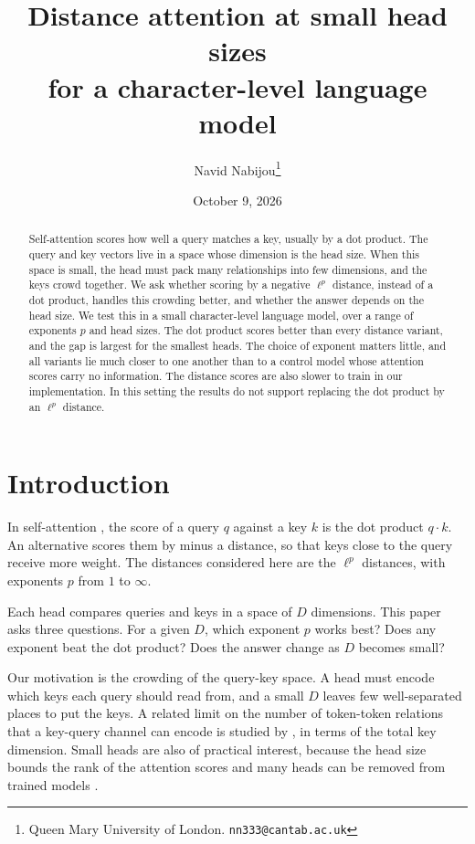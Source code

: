 \documentclass[11pt]{article}
\title{Distance attention at small head sizes\\for a character-level language model}
\author{Navid Nabijou\thanks{Queen Mary University of London. \texttt{nn333@cantab.ac.uk}}}
\date{October 9, 2026}
\begin{document}
\maketitle

\begin{abstract}
Self-attention scores how well a query matches a key, usually by a dot product.
The query and key vectors live in a space whose dimension is the head size.
When this space is small, the head must pack many relationships into few dimensions, and the keys crowd together.
We ask whether scoring by a negative $\ell^p$ distance, instead of a dot product, handles this crowding better, and whether the answer depends on the head size.
We test this in a small character-level language model, over a range of exponents $p$ and head sizes.
The dot product scores better than every distance variant, and the gap is largest for the smallest heads.
The choice of exponent matters little, and all variants lie much closer to one another than to a control model whose attention scores carry no information.
The distance scores are also slower to train in our implementation.
In this setting the results do not support replacing the dot product by an $\ell^p$ distance.
\end{abstract}

\section{Introduction}

In self-attention \citep{vaswani2017}, the score of a query $q$ against a key $k$ is the dot product $q\cdot k$.
An alternative scores them by minus a distance, so that keys close to the query receive more weight.
The distances considered here are the $\ell^p$ distances, with exponents $p$ from $1$ to $\infty$.

Each head compares queries and keys in a space of $D$ dimensions.
This paper asks three questions.
For a given $D$, which exponent $p$ works best?
Does any exponent beat the dot product?
Does the answer change as $D$ becomes small?

Our motivation is the crowding of the query-key space.
A head must encode which keys each query should read from, and a small $D$ leaves few well-separated places to put the keys.
A related limit on the number of token-token relations that a key-query channel can encode is studied by \citet{adler2026}, in terms of the total key dimension.
Small heads are also of practical interest, because the head size bounds the rank of the attention scores \citep{bhojanapalli2020} and many heads can be removed from trained models \citep{michel2019}.
\end{document}
